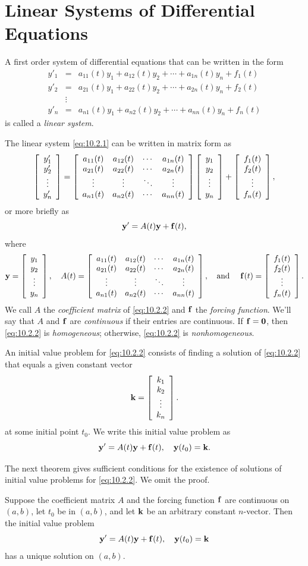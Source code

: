 \section{Linear Systems of Differential Equations}

\noindent
A first order system of differential equations that can be written in the form
\begin{equation}
  \label{eq:10.2.1}
  \begin{array}{ccl}
    y'_{1} & =     & a_{11}(t)y_{1}+a_{12}(t)y_{2}+\cdots+a_{1n}(t)y_{n}+f_{1}(t) \\
    y'_{2} & =     & a_{21}(t)y_{1}+a_{22}(t)y_{2}+\cdots+a_{2n}(t)y_{n}+f_{2}(t) \\
           & \vdots \\
    y'_{n} & =     & a_{n1}(t)y_{1}+a_{n2}(t)y_{2}+\cdots+a_{nn}(t)y_{n}+f_{n}(t)
  \end{array}
\end{equation}
is called a {\color{blue}\it linear system\/}.

The linear system \eqref{eq:10.2.1} can be written in matrix form as
\[
  \left[\begin{array}{c}y'_1\\y'_2\\\vdots\\y'_n\end{array}\right]=\left[\begin{array}{cccc}a_{11}(t)&a_{12}(t)&\cdots &a_{1n}(t)\\a_{21}(t)&a_{22}(t)&\cdots&a_{2n}(t)\\\vdots& \vdots&\ddots&\vdots\\a_{n1}(t)&a_{n2}(t)&\cdots&a_{nn}(t) \end{array}\right]\left[\begin{array}{c}y_1\\y_2\\\vdots\\y_n\end{array}\right]+\left[\begin{array}{c}f_1(t)\\f_2(t)\\\vdots\\f_n(t)\end{array}\right],
\]
or more briefly as
\begin{equation}
  \label{eq:10.2.2}{\bf y}'=A(t){\bf y}+{\bf f}(t),
\end{equation}
where
\[
  {\bf y}=\left[\begin{array}{c}y_1\\y_2\\\vdots\\y_n\end{array}\right],\quad A(t)=\left[\begin{array}{cccc}a_{11}(t)&a_{12}(t)&\cdots &a_{1n}(t)\\a_{21}(t)&a_{22}(t)&\cdots&a_{2n}(t)\\\vdots& \vdots&\ddots&\vdots\\a_{n1}(t)&a_{n2}(t)&\cdots&a_{nn}(t) \end{array}\right],\mbox{\quad and \quad}{\bf f}(t)=\left[\begin{array}{c}f_1(t)\\f_2(t)\\\vdots\\f_n(t)\end{array}\right].
\]
We call $A$ the {\color{blue}\it coefficient matrix\/} of \eqref{eq:10.2.2} and ${\bf f}$ the
{\color{blue}\it forcing function\/}. We'll say that $A$ and ${\bf f}$ are {\color{blue}\it
continuous\/} if their entries are continuous. If ${\bf f}={\bf0}$, then \eqref{eq:10.2.2} is
{\color{blue}\it homogeneous\/}; otherwise, \eqref{eq:10.2.2} is {\color{blue}\it nonhomogeneous\/}.

An initial value problem for \eqref{eq:10.2.2} consists of finding a solution of \eqref{eq:10.2.2}
that equals a given constant vector
\[
  {\bf k}=\left[\begin{array}{c}k_1\\k_2\\\vdots\\k_n\end{array}\right].
\]
at some initial point $t_{0}$. We write this initial value problem as
\[
  {\bf y}'=A(t){\bf y}+{\bf f}(t),\quad{\bf y}(t_{0})={\bf k}.
\]

The next theorem gives sufficient conditions for the existence of solutions of initial value
problems for \eqref{eq:10.2.2}. We omit the proof.

\begin{theorem}
  \color{blue}
  \label{thmtype:10.2.1} Suppose the coefficient matrix $A$ and the forcing function ${\bf f}$ are
  continuous on $(a,b)$, let $t_{0}$ be in $(a,b)$, and let ${\bf k}$ be an arbitrary constant
  $n$-vector. Then the initial value problem
  \[
    {\bf y}'=A(t){\bf y}+{\bf f}(t),\quad{\bf y}(t_{0})={\bf k}
  \]
  has a unique solution on $(a,b)$.
\end{theorem}

